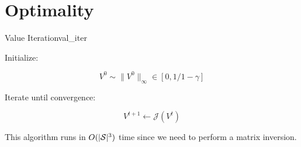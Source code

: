 \documentclass[../main/main]{subfiles}
\begin{document}






\section{Optimality}


\begin{theorem}{Value Iteration}{val_iter}

Initialize:

\[
    V^0 \sim \|V^0\|_\infty \in [0, 1/1-\gamma]
\]

Iterate until convergence:

\[
    V^{t+1} \gets \mathcal{J}(V^t)
\]


This algorithm runs in $O(|\S|^3)$ time since we need to perform a matrix
inversion.

\end{theorem}
\end{document}
